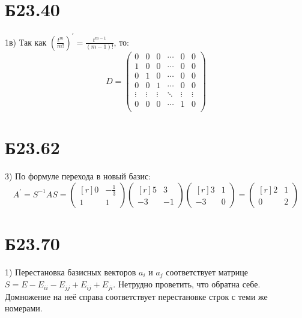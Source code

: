 \section*{Б23.40}1в)
Так как $\left(\frac{t^{m}}{m!}\right)^{\prime}=\frac{t^{m-1}}{(m-1)!}$, то:
$$D=\begin{pmatrix*}
    0&0&0&\cdots&0&0\\
    1&0&0&\cdots&0&0\\
    0&1&0&\cdots&0&0\\
    0&0&1&\cdots&0&0\\
    \vdots&\vdots&\vdots&\ddots&\vdots&\vdots\\
    0&0&0&\cdots&1&0\\
\end{pmatrix*}$$
\section*{Б23.62}3) По формуле перехода в новый базис:
$$A^{'}=S^{-1}AS=\begin{pmatrix*}[r]
    0&-\frac{1}{3}\\
    1&1
\end{pmatrix*}\begin{pmatrix*}[r]
    5&3\\
    -3&-1
\end{pmatrix*}\begin{pmatrix*}[r]
    3&1\\
    -3&0
\end{pmatrix*}=\begin{pmatrix*}[r]
    2&1\\
    0&2
\end{pmatrix*}$$
\section*{Б23.70}1) Перестановка базисных векторов $a_{i}$ и $a_{j}$ соответствует матрице $S=E-E_{ii}-E_{jj}+E_{ij}+E_{ji}$. Нетрудно проветить, что обратна себе. Домножение на неё справа соответствует перестановке строк с теми же номерами.
